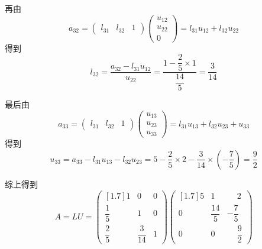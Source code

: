 \documentclass[11pt]{article}
\begin{document}
\begin{question}
{        再由
        \begin{equation*}
            a_{32} =
            \begin{pmatrix}
                l_{31} & l_{32} & 1
            \end{pmatrix}
            \begin{pmatrix}
                u_{12} \\
                u_{22} \\
                0
            \end{pmatrix}
            = l_{31}u_{12} + l_{32}u_{22}
        \end{equation*}
        得到
        \begin{equation*}
            l_{32} = \frac{a_{32} - l_{31}u_{12}}{u_{22}} = \frac{1 - \dfrac{2}{5} \times 1}{\dfrac{14}{5}} = \frac{3}{14}
        \end{equation*}

        最后由
        \begin{equation*}
            a_{33} =
            \begin{pmatrix}
                l_{31} & l_{32} & 1
            \end{pmatrix}
            \begin{pmatrix}
                u_{13} \\
                u_{23} \\
                u_{33}
            \end{pmatrix}
            = l_{31}u_{13} + l_{32}u_{23} + u_{33}
        \end{equation*}
        得到
        \begin{equation*}
            u_{33} = a_{33} - l_{31}u_{13} - l_{32}u_{23} = 5 - \frac{2}{5} \times 2 - \frac{3}{14} \times (-\frac{7}{5}) = \frac{9}{2}
        \end{equation*}

        综上得到
        \begin{equation*}
            A = LU = \begin{pmatrix}[1.7]
                1            & 0             & 0 \\
                \dfrac{1}{5} & 1             & 0 \\
                \dfrac{2}{5} & \dfrac{3}{14} & 1
            \end{pmatrix} \begin{pmatrix}[1.7]
                5 & 1             & \phantom{-}2            \\
                0 & \dfrac{14}{5} & -\dfrac{7}{5}           \\
                0 & 0             & \phantom{-}\dfrac{9}{2}
            \end{pmatrix}
        \end{equation*}

}
\end{question}
\end{document}
